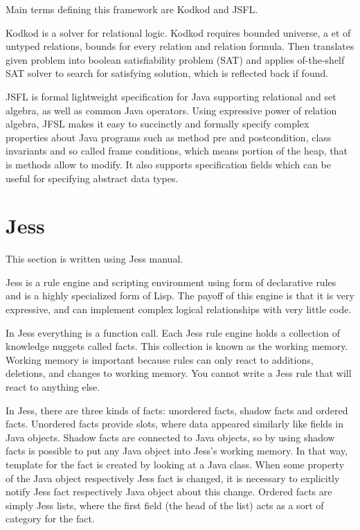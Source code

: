 \documentclass[conference]{IEEEtran}
\begin{document}
Main terms defining this framework are Kodkod and JSFL. 

Kodkod is a solver for relational logic. Kodkod requires bounded universe, a  et
of untyped relations, bounds for every relation and relation formula. Then
translates given problem into boolean satisfiability problem (SAT) and applies
of-the-shelf SAT solver to search for satisfying solution, which is reflected
back if found.

JSFL is formal lightweight specification for Java supporting relational and set
algebra, as well as common Java operators. Using expressive power of relation
algebra, JFSL makes it easy to succinctly and formally specify complex
properties about Java programs such as method pre and postcondition, class
invariants and so called frame conditions, which means portion of the heap, that
is methods allow to modify. It also supports specification fields
which can be useful for specifying abstract data types.

 
\section{Jess}
This section is written using Jess manual\cite{jess:manual}.


Jess is a rule engine and scripting environment using form
of declarative rules and is a highly specialized form of Lisp. The payoff of
this engine is that it is very expressive, and can implement complex logical
relationships with very little code.

In Jess everything is a function call. Each Jess rule engine holds a collection
of knowledge nuggets called facts. This collection is known as the working
memory. Working memory is important because rules can only react to additions,
deletions, and changes to working memory. You cannot write a Jess rule that will
react to anything else.



In Jess, there are three kinds of facts: unordered facts, shadow facts and
ordered facts. Unordered facts provide slots, where data appeared similarly like
fields in Java objects. Shadow facts are connected to Java objects, so by using
shadow facts is possible to put any Java object into Jess's working memory. In
that way, template for the fact is created by looking at a Java class.
When some property of the Java object respectively Jess fact is changed, it is
necessary to explicitly notify Jess fact respectively Java object about this
change. Ordered facts are simply Jess lists, where the first field (the head of
the list) acts as a sort of category for the fact. 
\end{document}
